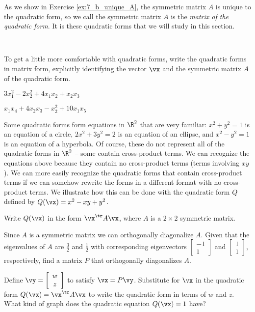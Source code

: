 As we show in Exercise \ref{ex:7_b_unique_A}, the symmetric matrix $A$ is unique to the quadratic form, so we call the symmetric matrix $A$ is the \emph{matrix of the quadratic form}. It is these quadratic forms that we will study in this section.

\begin{pa} \label{pa:7_b}  ~
\be
\item To get a little more comfortable with quadratic forms, write the quadratic forms in matrix form, explicitly identifying the vector $\vx$ and the symmetric matrix $A$ of the quadratic form.
	\ba
	\item $3x_1^2-2x_2^2 +4x_1x_2+x_2x_3$ 

	\item  $x_1x_4 + 4x_2x_3 - x_2^2 + 10x_1x_5$ 

	\ea

\item Some quadratic forms form equations in $\R^2$ that are very familiar: $x^2+y^2=1$ is an equation of a circle, $2x^2+3y^2=2$ is an equation of an ellipse, and $x^2-y^2=1$ is an equation of a hyperbola. Of course, these do not represent all of the quadratic forms in $\R^2$ -- some contain cross-product terms. We can recognize the equations above because they contain no cross-product terms (terms involving $xy$). We can more easily recognize the quadratic forms that contain cross-product terms if  we can somehow rewrite the forms in a different format with no cross-product terms. We illustrate how this can be done with the quadratic form $Q$ defined by $Q(\vx) = x^2-xy+y^2$. 
    \ba
    \item Write $Q(\vx)$ in the form $\vx^{\tr} A \vx$, where $A$ is a $2 \times 2 $ symmetric matrix.

    \item Since $A$ is a symmetric matrix we can orthogonally diagonalize $A$. Given that the eigenvalues of $A$ are $\frac{3}{2}$ and $\frac{1}{2}$ with corresponding eigenvectors $\left[ \begin{array}{r} -1 \\ 1 \end{array} \right]$ and $\left[ \begin{array}{c} 1 \\ 1 \end{array} \right]$, respectively, find a matrix $P$ that orthogonally diagonalizes $A$.

    \item Define $\vy = \left[ \begin{array}{c} w \\ z \end{array} \right]$ to satisfy $\vx = P\vy$. Substitute for $\vx$ in the quadratic form $Q(\vx) = \vx^{\tr}A\vx$ to write the quadratic form in terms of $w$ and $z$. What kind of graph does the quadratic equation $Q(\vx) = 1$ have?

    \ea
	

\ee

\end{pa} 



